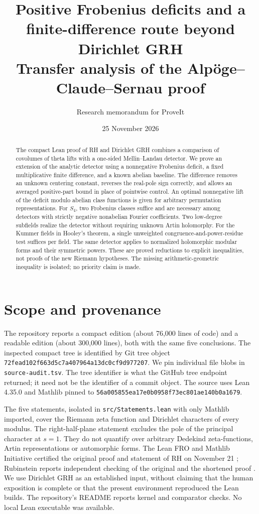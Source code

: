 \documentclass[11pt]{article}
\title{\color{ink}\bfseries Positive Frobenius deficits and a finite-difference route beyond Dirichlet GRH\\[6pt]\large Transfer analysis of the Alp\"oge--Claude--Sernau proof}
\author{Research memorandum for ProveIt}
\date{25 November 2026}
\theoremstyle{definition}\newtheorem{definition}[theorem]{Definition}
\begin{document}
\maketitle
\begin{abstract}
The compact Lean proof of RH and Dirichlet GRH combines a comparison of covolumes of theta lifts with a one-sided Mellin--Landau detector. We prove an extension of the analytic detector using a nonnegative Frobenius deficit, a fixed multiplicative finite difference, and a known abelian baseline. The difference removes an unknown centering constant, reverses the real-pole sign correctly, and allows an averaged positive-part bound in place of pointwise control. An optimal nonnegative lift of the deficit modulo abelian class functions is given for arbitrary permutation representations. For $S_4$, two Frobenius classes suffice and are necessary among detectors with strictly negative nonabelian Fourier coefficients. Two low-degree subfields realize the detector without requiring unknown Artin holomorphy. For the Kummer fields in Hooley's theorem, a single unweighted congruence-and-power-residue test suffices per field. The same detector applies to normalized holomorphic modular forms and their symmetric powers. These are proved reductions to explicit inequalities, not proofs of the new Riemann hypotheses. The missing arithmetic-geometric inequality is isolated; no priority claim is made.
\end{abstract}
\tableofcontents
\newpage
\section{Scope and provenance}
The repository \cite{repo} reports a compact edition (about 76,000 lines of code) and a readable edition (about 300,000 lines), both with the same five conclusions. The inspected compact tree is identified by Git tree object \nolinkurl{72fead102f663d5c7a407964a13dc0cf9d977207}. We pin individual file blobs in \texttt{source-audit.tsv}. The tree identifier is what the GitHub tree endpoint returned; it need not be the identifier of a commit object. The source uses Lean 4.35.0 and Mathlib pinned to \nolinkurl{56a005855ea17e0b0958f73ec801ae140b0a1679}.

The five statements, isolated in \texttt{src/Statements.lean} with only Mathlib imported, cover the Riemann zeta function and Dirichlet characters of every modulus. The right-half-plane statement excludes the pole of the principal character at $s=1$. They do not quantify over arbitrary Dedekind zeta-functions, Artin representations or automorphic forms. The Lean FRO and Mathlib Initiative certified the original proof and statement of RH on November 21 \cite{cert}; Rubinstein reports independent checking of the original and the shortened proof \cite{rubinstein}. We use Dirichlet GRH as an established input, without claiming that the human exposition is complete or that the present environment reproduced the Lean builds. The repository's README reports kernel and comparator checks. No local Lean executable was available.
\end{document}
